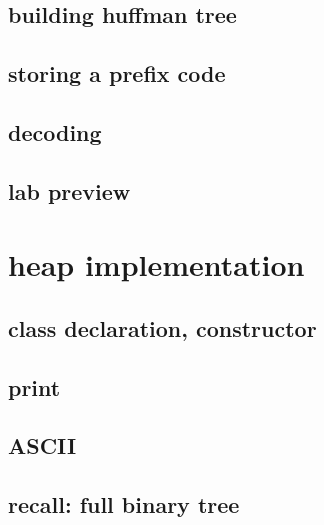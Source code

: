 

\subsection{building huffman tree}





\subsection{storing a prefix code}





\subsection{decoding}



\subsection{lab preview}



\section{heap implementation}



\subsection{class declaration, constructor}




\subsection{print}


\subsection{ASCII}

\subsection{recall: full binary tree}


